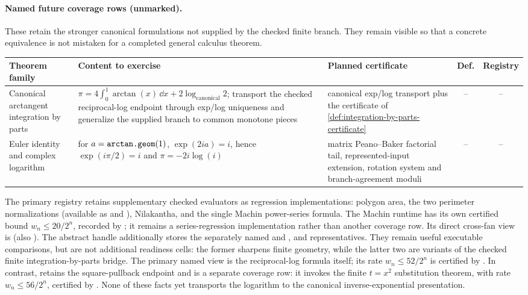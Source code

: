 \paragraph{Named future coverage rows (unmarked).}
These retain the stronger canonical formulations not supplied by the checked
finite branch.  They remain visible so that a concrete equivalence is not
mistaken for a completed general calculus theorem.
\begin{center}
\begin{tabular}{@{}p{}p{}p{}cc@{}}
\textbf{Theorem family} & \textbf{Content to exercise} &
\textbf{Planned certificate} & \textbf{Def.} & \textbf{Registry}\\
\hline
Canonical arctangent integration by parts &
\(\pi=4\int_0^1\arctan(x)\,\dd x+2\log_{\mathrm{canonical}}2\);
transport the checked reciprocal-log endpoint through exp/log uniqueness and
generalize the supplied branch to common monotone pieces &
canonical exp/log transport plus the certificate of
\cref{def:integration-by-parts-certificate} &
-- & --\\
Euler identity and complex logarithm &
for \(a=\mathop{\texttt{arctan.geom}}\nolimits(1)\),
\(\exp(2ia)=i\), hence
\(\exp(i\pi/2)=i\) and \(\pi=-2i\log(i)\) &
matrix Peano--Baker factorial tail, represented-input extension, rotation
system and branch-agreement moduli &
-- & --\\
\end{tabular}
\end{center}

The primary  registry retains supplementary
checked evaluators as regression implementations: polygon area, the two
perimeter normalizations (available as  and
), Nilakantha, and the single Machin power-series
formula.  The Machin runtime has its own certified bound
\(w_n\le20/2^n\), recorded by ; it remains a
series-regression implementation rather than another coverage row.  Its direct cross-fan view is  (also
).  The abstract  handle additionally stores the
separately named  and
, and 
representatives.  They remain useful
executable comparisons, but are not additional readiness cells: the former
sharpens finite geometry, while the latter two are variants of the checked
finite integration-by-parts bridge.  The primary named view
 is the reciprocal-log formula itself; its rate
\(w_n\le52/2^n\) is certified by
.  In contrast,
 retains the square-pullback endpoint and is a
separate coverage row: it invokes the finite \(t=x^2\) substitution theorem,
with rate \(w_n\le56/2^n\), certified by
.  None of these facts
yet transports the logarithm to the canonical inverse-exponential
presentation.

